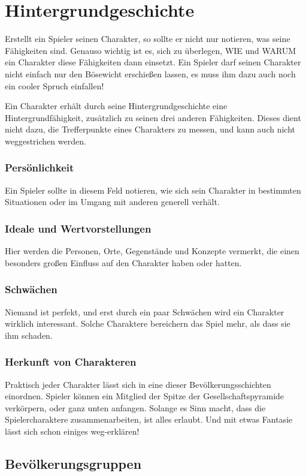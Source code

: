 \section{Hintergrundgeschichte}
Erstellt ein Spieler seinen Charakter, so sollte er nicht nur notieren, was seine Fähigkeiten sind. Genauso wichtig ist es, sich zu überlegen, WIE und WARUM ein Charakter diese Fähigkeiten dann einsetzt. Ein Spieler darf seinen Charakter nicht einfach nur den Bösewicht erschießen lassen, es muss ihm dazu auch noch ein cooler Spruch einfallen!

Ein Charakter erhält durch seine Hintergrundgeschichte eine Hintergrundfähigkeit, zusätzlich zu seinen drei anderen Fähigkeiten. Dieses dient nicht dazu, die Trefferpunkte eines Charakters zu messen, und kann auch nicht weggestrichen werden.
\subsubsection{Persönlichkeit}
Ein Spieler sollte in diesem Feld notieren, wie sich sein Charakter in bestimmten Situationen oder im Umgang mit anderen generell verhält.
\subsubsection{Ideale und Wertvorstellungen}
Hier werden die Personen, Orte, Gegenstände und Konzepte vermerkt, die einen besonders großen Einfluss auf den Charakter haben oder hatten.
\subsubsection{Schwächen}
Niemand ist perfekt, und erst durch ein paar Schwächen wird ein Charakter wirklich interessant. Solche Charaktere bereichern das Spiel mehr, als dass sie ihm schaden.
\subsubsection{Herkunft von Charakteren}
Praktisch jeder Charakter lässt sich in eine dieser \glqq Bevölkerungsschichten\grqq{} einordnen. Spieler können ein Mitglied der Spitze der Gesellschaftspyramide verkörpern, oder ganz unten anfangen. Solange es Sinn macht, dass die Spielercharaktere zusammenarbeiten, ist alles erlaubt. Und mit etwas Fantasie lässt sich schon einiges weg-erklären!

\subsection{Bevölkerungsgruppen}
